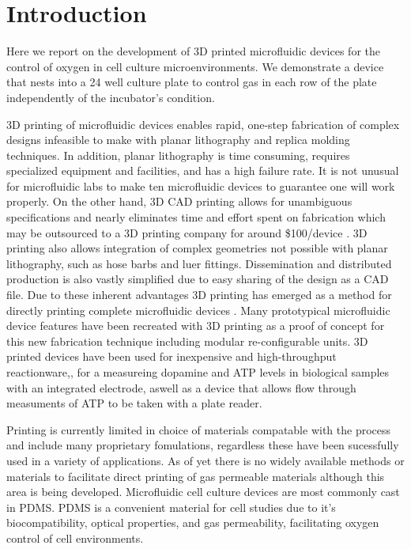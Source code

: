 \section*{Introduction}

Here we report on the development of 3D printed microfluidic devices for the control of oxygen in cell culture microenvironments.
We demonstrate a device that nests into a 24 well culture plate to control gas in each row of the plate independently of the incubator's condition.

3D printing of microfluidic devices enables rapid, one-step fabrication of complex designs infeasible to make with planar lithography and replica molding techniques.
In addition, planar lithography is time consuming, requires specialized equipment and facilities, and has a high failure rate.
It is not unusual for microfluidic labs to make ten microfluidic devices to guarantee one will work properly.
On the other hand, 3D CAD printing allows for unambiguous specifications and nearly eliminates time and effort spent on fabrication which may be outsourced to a 3D printing company for around \$100/device \cite{Au2014}.
3D printing also allows integration of complex geometries not possible with planar lithography, such as hose barbs and luer fittings.
Dissemination and distributed production is also vastly simplified due to easy sharing of the design as a CAD file.
Due to these inherent advantages 3D printing has emerged as a method for directly printing complete microfluidic devices \cite{Au2014, Shallan 2014, Chen2014, Erkal2014,Bhargava2014}. 
Many prototypical microfluidic device features have been recreated with 3D printing as a proof of concept for this new fabrication technique \cite{Au2014, Shallan2014} including modular re-configurable units\cite{Bharagava2014}.
3D printed devices have been used for inexpensive and high-throughput reactionware,\cite{Kitson2014}, for a measureing dopamine and ATP levels in biological samples with an integrated electrode\cite{Erkal2014}, aswell as a device that allows flow through measuments of ATP to be taken with a plate reader\cite{Chen2014}.

Printing is currently limited in choice of materials compatable with the process and include many proprietary fomulations, regardless these have been sucessfully used in a variety of applications.
As of yet there is no widely available methods or materials to facilitate direct printing of gas permeable materials although this area is being developed\cite{Femmer2014}.
Microfluidic cell culture devices are most commonly cast in PDMS.
PDMS is a convenient material for cell studies due to it's biocompatibility, optical properties, and gas permeability, facilitating oxygen control of cell environments.

